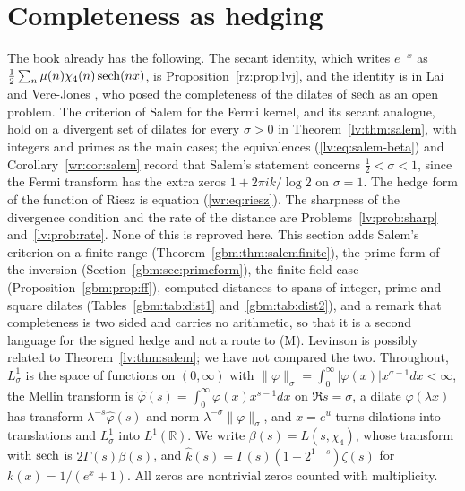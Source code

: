 \section{Completeness as hedging}\label{gbm:sec:complete}

The book already has the following. The secant identity, which writes $e^{-x}$ as $\frac12\sum_n\mu(n)\chi_4(n)\operatorname{sech}(nx)$, is Proposition~\ref{rz:prop:lvj}, and the identity is in Lai and Vere-Jones \cite{LVJ}, who posed the completeness of the dilates of $\operatorname{sech}$ as an open problem. The criterion of Salem \cite{Salem53} for the Fermi kernel, and its secant analogue, hold on a divergent set of dilates for every $\sigma>0$ in Theorem~\ref{lv:thm:salem}, with integers and primes as the main cases; the equivalences (\ref{lv:eq:salem-beta}) and Corollary~\ref{wr:cor:salem} record that Salem's statement concerns $\frac12<\sigma<1$, since the Fermi transform has the extra zeros $1+2\pi ik/\log2$ on $\sigma=1$. The hedge form of the function of Riesz is equation (\ref{wr:eq:riesz}). The sharpness of the divergence condition and the rate of the distance are Problems~\ref{lv:prob:sharp} and~\ref{lv:prob:rate}. None of this is reproved here. This section adds Salem's criterion on a finite range (Theorem~\ref{gbm:thm:salemfinite}), the prime form of the inversion (Section~\ref{gbm:sec:primeform}), the finite field case (Proposition~\ref{gbm:prop:ff}), computed distances to spans of integer, prime and square dilates (Tables~\ref{gbm:tab:dist1} and~\ref{gbm:tab:dist2}), and a remark that completeness is two sided and carries no arithmetic, so that it is a second language for the signed hedge and not a route to (M). Levinson \cite{Levinson56} is possibly related to Theorem~\ref{lv:thm:salem}; we have not compared the two. Throughout, $L^1_\sigma$ is the space of functions on $(0,\infty)$ with $\|\varphi\|_\sigma=\int_0^\infty\allowbreak|\varphi(x)|\allowbreak x^{\sigma-1}dx<\infty$, the Mellin transform is $\hat\varphi(s)=\int_0^\infty\allowbreak\varphi(x)\allowbreak x^{s-1}dx$ on $\Re s=\sigma$, a dilate $\varphi(\lambda x)$ has transform $\lambda^{-s}\hat\varphi(s)$ and norm $\lambda^{-\sigma}\|\varphi\|_\sigma$, and $x=e^u$ turns dilations into translations and $L^1_\sigma$ into $L^1(\mathbb R)$. We write $\beta(s)=L(s,\chi_4)$, whose transform with $\operatorname{sech}$ is $2\Gamma(s)\beta(s)$, and $\hat k(s)=\Gamma(s)(1-2^{1-s})\zeta(s)$ for $k(x)=1/(e^x+1)$. All zeros are nontrivial zeros counted with multiplicity.

